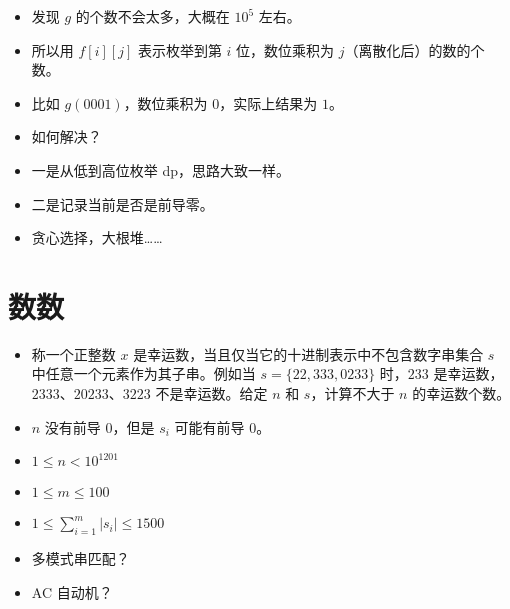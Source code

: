 \documentclass[serif]{beamer}
\begin{document}
\begin{frame}
  \begin{itemize}[<+-| alert@+>]
    \item 发现 $g$ 的个数不会太多，大概在 $10^5$ 左右。
    \item 所以用 $f[i][j]$ 表示枚举到第 $i$ 位，数位乘积为 $j$（离散化后）的数的个数。
    \item 比如 $g(0001)$，数位乘积为 $0$，实际上结果为 $1$。
    \item 如何解决？
  \end{itemize}
\end{frame}

\begin{frame}
  \begin{itemize}[<+-| alert@+>]
    \item 一是从低到高位枚举 dp，思路大致一样。
    \item 二是记录当前是否是前导零。
  \end{itemize}
\end{frame}

\begin{frame}
  \begin{itemize}[<+-| alert@+>]
    \item 贪心选择，大根堆……
  \end{itemize}
\end{frame}

\section{数数}
\begin{frame}
  \begin{itemize}
    \item 称一个正整数 $x$ 是幸运数，当且仅当它的十进制表示中不包含数字串集合 $s$ 中任意一个元素作为其子串。例如当 $s = \{22, 333, 0233\}$ 时，$233$ 是幸运数，$2333$、$20233$、$3223$ 不是幸运数。给定 $n$ 和 $s$，计算不大于 $n$ 的幸运数个数。
    \item $n$ 没有前导 $0$，但是 $s_i$ 可能有前导 $0$。
    \item $1 \leq n < 10^{1201}$
    \item $1 \leq m \leq 100$
    \item $1 \leq \sum_{i = 1}^m |s_i| \leq 1500$
  \end{itemize}
\end{frame}

\begin{frame}
  \begin{itemize}[<+-| alert@+>]
    \item 多模式串匹配？
    \item AC 自动机？
  \end{itemize}
\end{frame}
\end{document}
